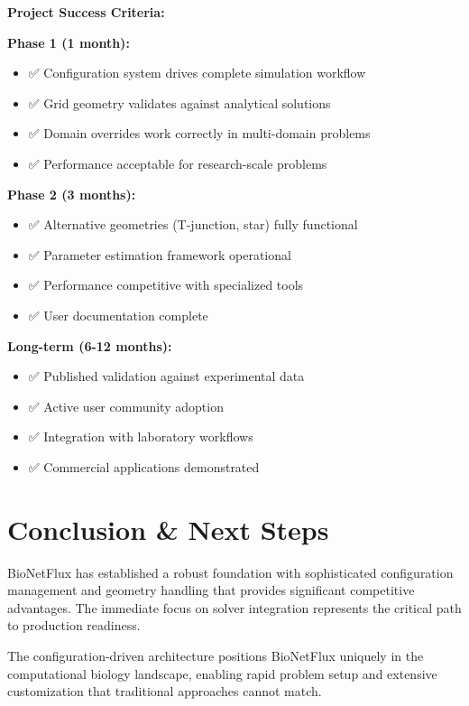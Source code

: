 \documentclass[11pt,a4paper]{article}
\begin{document}
\begin{notebox}
\textbf{Project Success Criteria:}

\textbf{Phase 1 (1 month):}
\begin{itemize}[leftmargin=1.5em]
    \item ✅ Configuration system drives complete simulation workflow  
    \item ✅ Grid geometry validates against analytical solutions
    \item ✅ Domain overrides work correctly in multi-domain problems
    \item ✅ Performance acceptable for research-scale problems
\end{itemize}

\textbf{Phase 2 (3 months):}
\begin{itemize}[leftmargin=1.5em]
    \item ✅ Alternative geometries (T-junction, star) fully functional
    \item ✅ Parameter estimation framework operational  
    \item ✅ Performance competitive with specialized tools
    \item ✅ User documentation complete
\end{itemize}

\textbf{Long-term (6-12 months):}
\begin{itemize}[leftmargin=1.5em]
    \item ✅ Published validation against experimental data
    \item ✅ Active user community adoption
    \item ✅ Integration with laboratory workflows
    \item ✅ Commercial applications demonstrated
\end{itemize}
\end{notebox}

\section{Conclusion \& Next Steps}

BioNetFlux has established a robust foundation with sophisticated configuration management and geometry handling that provides significant competitive advantages. The immediate focus on solver integration represents the critical path to production readiness.

The configuration-driven architecture positions BioNetFlux uniquely in the computational biology landscape, enabling rapid problem setup and extensive customization that traditional approaches cannot match.
\end{document}
